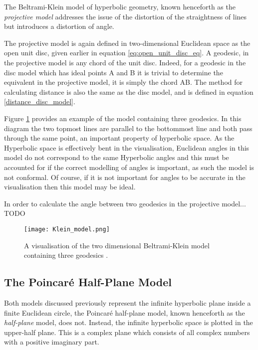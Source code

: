 The Beltrami-Klein model of hyperbolic geometry, known henceforth as the \textit{projective model} addresses the issue of the distortion of the straightness of lines but introduces a distortion of angle.

The projective model is again defined in two-dimensional Euclidean space as the open unit disc, given earlier in equation \ref{eq:open_unit_disc_eq}. A geodesic, in the projective model is any chord of the unit disc. Indeed, for a geodesic in the disc model which has ideal points A and B it is trivial to determine the equivalent in the projective model, it is simply the chord AB. The method for calculating distance is also the same as the disc model, and is defined in equation \ref{distance_disc_model}.


Figure \ref{fig:klein_example} provides an example of the model containing three geodesics. In this diagram the two topmost lines are parallel to the bottommost line and both pass through the same point, an important property of hyperbolic space. As the Hyperbolic space is effectively bent in the visualisation, Euclidean angles in this model do not correspond to the same Hyperbolic angles and this must be accounted for if the correct modelling of angles is important, as such the model is not conformal. Of course, if it is not important for angles to be accurate in the visualisation then this model may be ideal.

In order to calculate the angle between two geodesics in the projective model... TODO

\begin{figure}
	\centering
	\texttt{[image: Klein\_model.png]}
	\caption[A visualisation of the two dimensional Beltrami-Klein model containing three geodesics]{A visualisation of the two dimensional Beltrami-Klein model containing three geodesics .}
	\label{fig:klein_example}
\end{figure}

\subsection{The Poincar\'{e} Half-Plane Model}

Both models discussed previously represent the infinite hyperbolic plane inside a finite Euclidean circle, the Poincar\'{e} half-plane model, known henceforth as the \textit{half-plane} model, does not. Instead, the infinite hyperbolic space is plotted in the upper-half plane. This is a complex plane which consists of all complex numbers with a positive imaginary part. 

